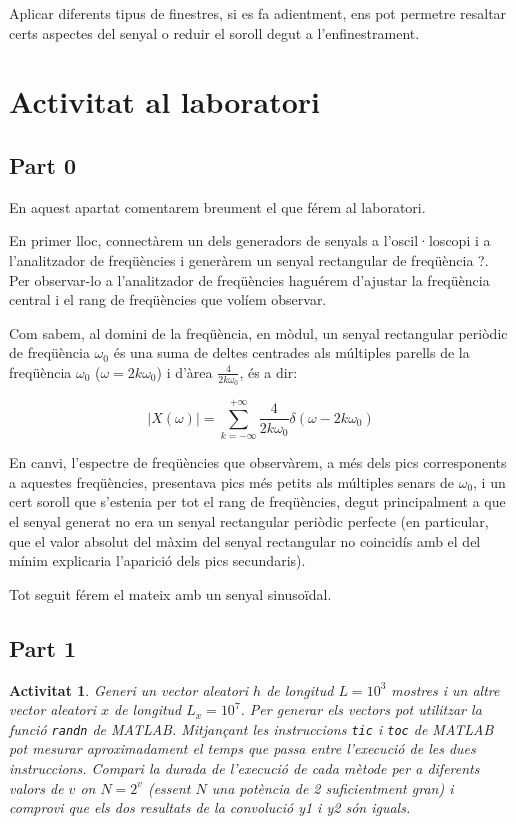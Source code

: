 \documentclass[11pt,a4]{article}
\numberwithin{equation}{section}
\theoremstyle{thmstyle}
\theoremstyle{thmstyle}
\theoremstyle{thmstyle}
\theoremstyle{thmstyle}
\theoremstyle{thmstyle}
\theoremstyle{thmstyle}
\theoremstyle{thmstyle}
\newtheorem{activity}{Activitat}
\begin{document}
Aplicar diferents tipus de finestres, si es fa adientment, ens pot permetre resaltar certs aspectes del senyal o reduir el soroll degut a l'enfinestrament.

\section{Activitat al laboratori}

\subsection{Part 0}

En aquest apartat comentarem breument el que férem al laboratori.

En primer lloc, connectàrem un dels generadors de senyals a l'oscil·loscopi i a l'analitzador de freqüències  i generàrem un senyal rectangular de freqüència ?. Per observar-lo a l'analitzador de freqüències haguérem d'ajustar la freqüència central i el rang de freqüències que volíem observar. 

Com sabem, al domini de la freqüència, en mòdul, un senyal rectangular periòdic de freqüència $\omega_0$ és una suma de deltes centrades als múltiples parells de la freqüència $\omega_0$ ($\omega = 2k\omega_0$) i d'àrea $\frac{4}{2k\omega_0}$, és a dir:

$$
\vert X(\omega)\vert = \sum_{k = -\infty}^{+\infty} \frac{4}{2k\omega_0}\delta(\omega-2k\omega_0)
$$

En canvi, l'espectre de freqüències que observàrem, a més dels pics corresponents a aquestes freqüències, presentava pics més petits als múltiples senars de $\omega_0$, i un cert soroll que s'estenia per tot el rang de freqüències, degut principalment a que el senyal generat no era un senyal rectangular periòdic perfecte (en particular, que el valor absolut del màxim del senyal rectangular no coincidís amb el del mínim explicaria l'aparició dels pics secundaris).

Tot seguit férem el mateix amb un senyal sinusoïdal. 

\subsection{Part 1}

\begin{activity}
Generi un vector aleatori $h$ de longitud $L=10^3$ mostres i un altre vector aleatori $x$ de longitud $L_x=10^7$. Per generar els vectors pot utilitzar la funció {\tt randn} de MATLAB. Mitjançant les instruccions {\tt tic} i {\tt toc} de MATLAB pot mesurar aproximadament el temps que passa entre l’execució de les dues instruccions. Compari la durada de l’execució de cada mètode per a diferents valors de $v$ on $N=2^v$ (essent $N$ una potència de 2 suficientment gran) i comprovi que els dos resultats de la convolució y1 i y2 són iguals.
\end{activity}
\end{document}
